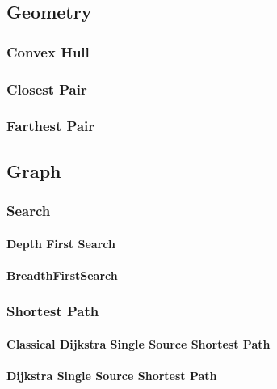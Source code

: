 \documentclass[8pt]{article}
\begin{document}
\subsection{Geometry}
\subsubsection{Convex Hull}

\subsubsection{Closest Pair}

\subsubsection{Farthest Pair}


\subsection{Graph}
\subsubsection{Search}
\paragraph{Depth First Search}

\paragraph{BreadthFirstSearch}


\subsubsection{Shortest Path}
\paragraph{Classical Dijkstra Single Source Shortest Path}

\paragraph{Dijkstra Single Source Shortest Path}

\end{document}
